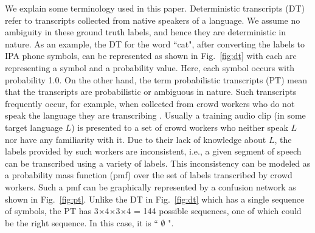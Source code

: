 \documentclass[a4paper]{article}
\begin{document}
We explain some terminology used in this paper. Deterministic transcripts (DT) refer to transcripts collected from native speakers of a language. We assume no ambiguity in these ground truth labels, and hence they are deterministic in nature. As an example, the DT for the word ``cat", after converting the labels to IPA phone symbols, can be represented as shown in Fig.~\ref{fig:dt} with each arc representing a symbol and a probability value. Here, each symbol occurs with probability 1.0. On the other hand, the term probabilistic transcripts (PT) mean that the transcripts are probabilistic or ambiguous in nature. Such transcripts frequently occur, for example, when collected from crowd workers who do not speak the language they are transcribing \cite{Jyothi-MismatchedCrowdsourcingTrans}. Usually a training audio clip (in some target language $L$) is presented to a set of crowd workers who neither speak $L$ nor have any familiarity with it. Due to their lack of knowledge about $L$, the labels provided by such workers are inconsistent, i.e., a given segment of speech can be transcribed using a variety of labels. This inconsistency can be modeled as a probability mass function (pmf) over the set of labels transcribed by crowd workers. Such a pmf can be graphically represented by a confusion network as shown in Fig.~\ref{fig:pt}. Unlike the DT in Fig.~\ref{fig:dt} which has a single sequence of symbols, the PT has 3$\times$4$\times$3$\times$4 = 144 possible sequences, one of which could be the right sequence. In this case, it is `` \ipa{\ae} $\emptyset$ ".

\end{document}
